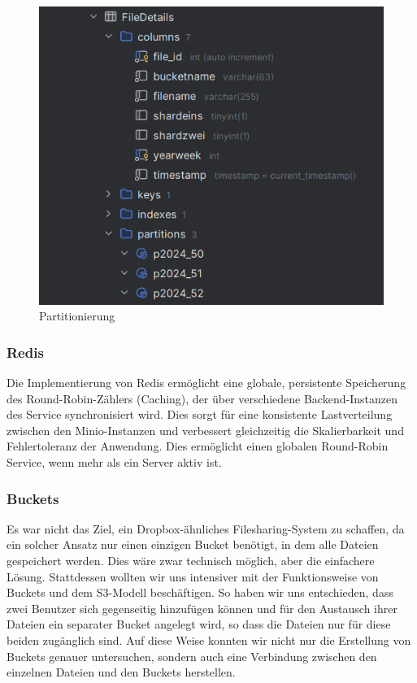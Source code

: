\documentclass[12pt]{report}
\begin{document}
				\begin{figure}[h]
					\centering
					\includegraphics[width=0.8\linewidth]{partitionierung}
					\caption{Partitionierung}
					\label{fig:partitionierung}
				\end{figure}
				
			\subsubsection{Redis}
				Die Implementierung von Redis ermöglicht eine globale, persistente \cite{eddelbuettel2022brief} Speicherung des Round-Robin-Zählers (Caching), der über verschiedene Backend-Instanzen des Service synchronisiert wird. Dies sorgt für eine konsistente Lastverteilung zwischen den Minio-Instanzen und verbessert gleichzeitig die Skalierbarkeit und Fehlertoleranz der Anwendung. Dies ermöglicht einen globalen Round-Robin Service, wenn mehr als ein Server aktiv ist.
				
			\subsubsection{Buckets}
				Es war nicht das Ziel, ein Dropbox-ähnliches Filesharing-System zu schaffen, da ein solcher Ansatz nur einen einzigen Bucket benötigt, in dem alle Dateien gespeichert werden. Dies wäre zwar technisch möglich, aber die einfachere Lösung. Stattdessen wollten wir uns intensiver mit der Funktionsweise von Buckets und dem S3-Modell beschäftigen. So haben wir uns entschieden, dass zwei Benutzer sich gegenseitig hinzufügen können und für den Austausch ihrer Dateien ein separater Bucket angelegt wird, so dass die Dateien nur für diese beiden zugänglich sind. Auf diese Weise konnten wir nicht nur die Erstellung von Buckets genauer untersuchen, sondern auch eine Verbindung zwischen den einzelnen Dateien und den Buckets herstellen.
				
\end{document}

